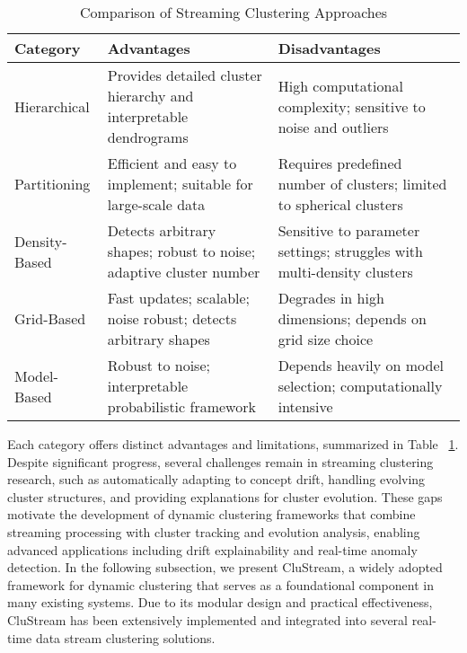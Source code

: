 \begin{table}[H]
    \centering

    \begin{tabular}{|l|p{6cm}|p{6cm}|}
        \hline
        \textbf{Category} & \textbf{Advantages}                                                & \textbf{Disadvantages}                                                 \\
        \hline
        Hierarchical      & Provides detailed cluster hierarchy and interpretable dendrograms  & High computational complexity; sensitive to noise and outliers         \\
        Partitioning      & Efficient and easy to implement; suitable for large-scale data     & Requires predefined number of clusters; limited to spherical clusters  \\
        Density-Based     & Detects arbitrary shapes; robust to noise; adaptive cluster number & Sensitive to parameter settings; struggles with multi-density clusters \\
        Grid-Based        & Fast updates; scalable; noise robust; detects arbitrary shapes     & Degrades in high dimensions; depends on grid size choice               \\
        Model-Based       & Robust to noise; interpretable probabilistic framework             & Depends heavily on model selection; computationally intensive          \\
        \hline
    \end{tabular}
    \caption{Comparison of Streaming Clustering Approaches}
    \label{table:streaming-clustering-comparison}
\end{table}

Each category offers distinct advantages and limitations, summarized in Table
~\ref{table:streaming-clustering-comparison}. Despite significant progress,
several challenges remain in streaming clustering research, such as
automatically adapting to concept drift, handling evolving cluster structures,
and providing explanations for cluster evolution. These gaps motivate the
development of dynamic clustering frameworks that combine streaming processing
with cluster tracking and evolution analysis, enabling advanced applications
including drift explainability and real-time anomaly detection. In the
following subsection, we present CluStream, a widely adopted framework for
dynamic clustering that serves as a foundational component in many existing
systems. Due to its modular design and practical effectiveness, CluStream has
been extensively implemented and integrated into several real-time data stream
clustering solutions.

